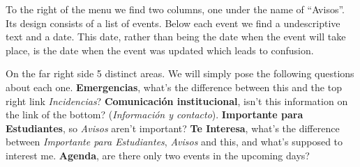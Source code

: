 \documentclass{article}
\begin{document}
To the right of the menu we find two columns, one under the name of “Avisos”. Its design consists of a list of events. Below each event we find a undescriptive text and a date. This date, rather than being the date when the event will take place, is the date when the event was updated which leads to confusion.

On the far right side 5 distinct areas. We will simply pose the following questions about each one.
\textbf{Emergencias}, what’s the difference between this and the top right link \textit{Incidencias}? \textbf{Comunicación institucional}, isn’t this information on the link of the bottom? (\textit{Información y contacto}).
\textbf{Importante para Estudiantes}, so \textit{Avisos} aren’t important?
\textbf{Te Interesa}, what’s the difference between \textit{Importante para Estudiantes}, \textit{Avisos} and this, and what’s supposed to interest me.
\textbf{Agenda}, are there only two events in the upcoming days?\\
\end{document}
